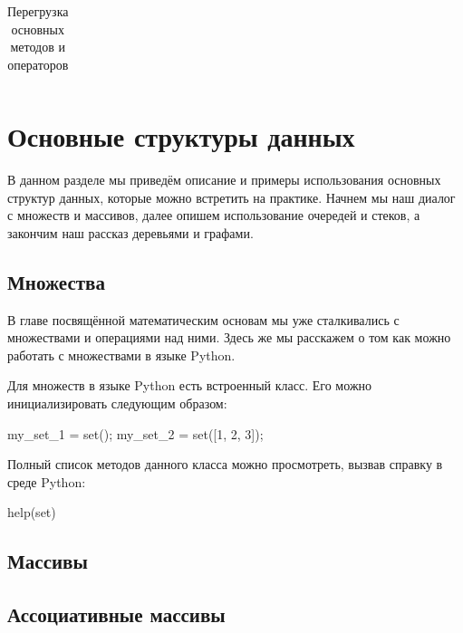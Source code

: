 \begin{table}[h!]
\begin{longtable}{|p{7cm}|p{8cm}|}



\end{longtable}
\caption{Перегрузка основных методов и операторов}
\label{tab:operators}
\end{table}

\chapter{Основные структуры данных}

В данном разделе мы приведём описание и примеры использования основных
структур данных, которые можно встретить на практике. Начнем мы наш 
диалог с множеств и массивов, далее опишем использование очередей и
стеков, а закончим наш рассказ деревьями и графами.

\section{Множества}

В главе посвящённой математическим основам мы уже сталкивались с
множествами и операциями над ними. Здесь же мы расскажем о том как 
можно работать с множествами в языке Python.

Для множеств в языке Python есть встроенный класс. Его можно инициализировать
следующим образом:

\begin{python}
my_set_1 = set();
my_set_2 = set([1, 2, 3]);
\end{python}

Полный список методов данного класса можно просмотреть, вызвав 
справку в среде Python:

\begin{python}
help(set)
\end{python}

\section{Массивы}

\section{Ассоциативные массивы}

